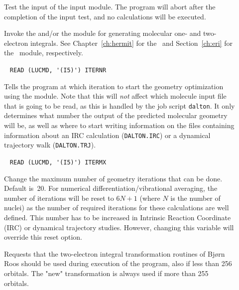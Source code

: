 \begin{description}
\item[] Test the input of the  input
module. The program will abort after the completion of the input test,
and no calculations will be executed.

\item[] Invoke the {\her} and/or the {\eri} module for generating molecular one-
and two-electron integrals.
See Chapter~\ref{ch:hermit} for the \her\ and
Section~\ref{ch:eri} for the \eri\ module, respectively.

\item[]\verb| |\newline
\verb|READ (LUCMD, '(I5)') ITERNR|

Tells the program at which iteration to start the geometry optimization
using the  module.
Note that this will {\em not} affect which molecule
input file that is going to be read, as this is handled by the
job script {\tt dalton}. It only determines what number the
output of the predicted molecular geometry will be, as well as where to start
writing information on the files containing information about an IRC
calculation (\verb|DALTON.IRC|) or a dynamical trajectory walk (\verb|DALTON.TRJ|).

\item[]\verb| |\newline
\verb|READ (LUCMD, '(I5)') ITERMX|

Change the maximum number of geometry iterations
that can be done. Default
is~20.  For numerical
differentiation/vibrational averaging, the number of iterations will
be reset to $6N+1$ (where $N$ is the number of nuclei) as the number
of required iterations for these calculations are well
defined. This number has to be increased in Intrinsic Reaction Coordinate
(IRC) or dynamical
trajectory studies. However, changing this variable will override this reset
option.


\item[] Requests that the
two-electron integral transformation routines of Bj\o rn
Roos should be used during execution of the program, also if less than
256 orbitals. The "new" transformation is always used if more than 255
orbitals.


\end{description}
